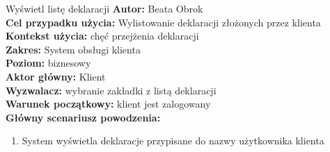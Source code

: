 	\begin{usecase}{Wyświetl listę deklaracji}
		\textbf{Autor:} Beata Obrok \\
		\textbf{Cel przypadku użycia:} Wylistowanie deklaracji złożonych przez klienta \\
		\textbf{Kontekst użycia:} chęć przejżenia deklaracji\\
		\textbf{Zakres:} System obsługi klienta \\
		\textbf{Poziom:} biznesowy \\
		\textbf{Aktor główny:} Klient\\
		\textbf{Wyzwalacz:} wybranie zakładki z listą deklaracji \\
		\textbf{Warunek początkowy:} klient jest zalogowany \\
		\textbf{Główny scenariusz powodzenia:} \\
			\begin{enumerate}
				\item System wyświetla deklaracje przypisane do nazwy użytkownika klienta
			\end{enumerate}
	\end{usecase}


